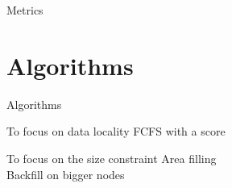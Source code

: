 \documentclass{libs/ufc_format}
\begin{document}
{\begin{frame}{Metrics}
\end{frame}



\section{Algorithms}

\begin{frame}{Algorithms}
\begin{block}{To focus on data locality}
FCFS with a score
\end{block}
\begin{block}{To focus on the size constraint}
Area filling\\
Backfill on bigger nodes
\end{block}
\end{frame}

}
\end{document}
